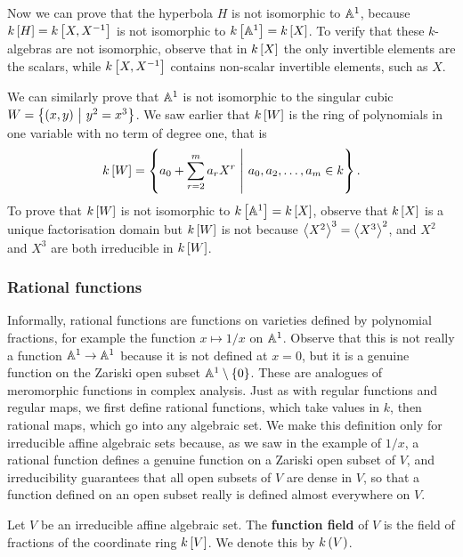 \begin{example*}
Now we can prove that the hyperbola $ H $ is not isomorphic to $ \AA^1 $, because $ k\sbr{H} = k\sbr{X, X^{-1}} $ is not isomorphic to $ k\sbr{\AA^1} = k\sbr{X} $. To verify that these $ k $-algebras are not isomorphic, observe that in $ k\sbr{X} $ the only invertible elements are the scalars, while $ k\sbr{X, X^{-1}} $ contains non-scalar invertible elements, such as $ X $.
\end{example*}

\begin{example*}
We can similarly prove that $ \AA^1 $ is not isomorphic to the singular cubic $ W = \cbr{\br{x, y} \st y^2 = x^3} $. We saw earlier that $ k\sbr{W} $ is the ring of polynomials in one variable with no term of degree one, that is
$$ k\sbr{W} = \cbr{a_0 + \sum_{r = 2}^m a_rX^r \st a_0, a_2, \dots, a_m \in k}. $$
To prove that $ k\sbr{W} $ is not isomorphic to $ k\sbr{\AA^1} = k\sbr{X} $, observe that $ k\sbr{X} $ is a unique factorisation domain but $ k\sbr{W} $ is not because $ \abr{X^2}^3 = \abr{X^3}^2 $, and $ X^2 $ and $ X^3 $ are both irreducible in $ k\sbr{W} $.
\end{example*}

\pagebreak

\subsubsection{Rational functions}

Informally, rational functions are functions on varieties defined by polynomial fractions, for example the function $ x \mapsto 1 / x $ on $ \AA^1 $. Observe that this is not really a function $ \AA^1 \to \AA^1 $ because it is not defined at $ x = 0 $, but it is a genuine function on the Zariski open subset $ \AA^1 \setminus \cbr{0} $. These are analogues of meromorphic functions in complex analysis. Just as with regular functions and regular maps, we first define rational functions, which take values in $ k $, then rational maps, which go into any algebraic set. We make this definition only for irreducible affine algebraic sets because, as we saw in the example of $ 1 / x $, a rational function defines a genuine function on a Zariski open subset of $ V $, and irreducibility guarantees that all open subsets of $ V $ are dense in $ V $, so that a function defined on an open subset really is defined almost everywhere on $ V $.

\begin{definition*}
Let $ V $ be an irreducible affine algebraic set. The \textbf{function field} of $ V $ is the field of fractions of the coordinate ring $ k\sbr{V} $. We denote this by $ k\br{V} $.
\end{definition*}

